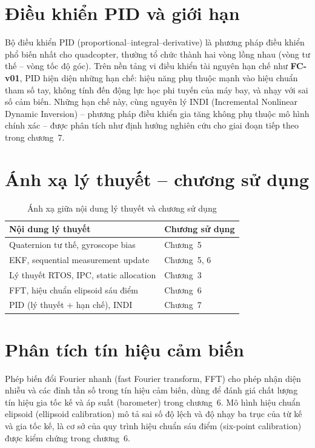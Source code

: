\section{Điều khiển PID và giới hạn}

Bộ điều khiển PID (proportional--integral--derivative) là phương pháp điều khiển phổ biến nhất cho quadcopter, thường tổ chức thành hai vòng lồng nhau (vòng tư thế -- vòng tốc độ góc). Trên nền tảng vi điều khiển tài nguyên hạn chế như \textbf{FC-v01}, PID hiện diện những hạn chế: hiệu năng phụ thuộc mạnh vào hiệu chuẩn tham số tay, không tính đến động lực học phi tuyến của máy bay, và nhạy với sai số cảm biến. Những hạn chế này, cùng nguyên lý INDI (Incremental Nonlinear Dynamic Inversion) -- phương pháp điều khiển gia tăng không phụ thuộc mô hình chính xác -- được phân tích như định hướng nghiên cứu cho giai đoạn tiếp theo trong chương~7.

\section{Ánh xạ lý thuyết -- chương sử dụng}

\begin{table}[h]
\centering
\caption{Ánh xạ giữa nội dung lý thuyết và chương sử dụng}
\label{tab:theory-mapping}
\begin{tabular}{ll}
\toprule
Nội dung lý thuyết & Chương sử dụng \\
\midrule
Quaternion tư thế, gyroscope bias & Chương~5 \\
EKF, sequential measurement update & Chương~5, 6 \\
Lý thuyết RTOS, IPC, static allocation & Chương~3 \\
FFT, hiệu chuẩn elipsoid sáu điểm & Chương~6 \\
PID (lý thuyết + hạn chế), INDI & Chương~7 \\
\bottomrule
\end{tabular}
\end{table}

\section{Phân tích tín hiệu cảm biến}

Phép biến đổi Fourier nhanh (fast Fourier transform, FFT) cho phép nhận diện nhiễu và các đỉnh tần số trong tín hiệu cảm biến, dùng để đánh giá chất lượng tín hiệu gia tốc kế và áp suất (barometer) trong chương~6. Mô hình hiệu chuẩn elipsoid (ellipsoid calibration) mô tả sai số độ lệch và độ nhạy ba trục của từ kế và gia tốc kế, là cơ sở của quy trình hiệu chuẩn sáu điểm (six-point calibration) được kiểm chứng trong chương~6.
